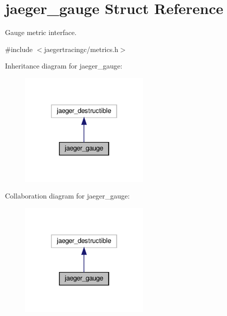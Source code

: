 \hypertarget{structjaeger__gauge}{}\section{jaeger\+\_\+gauge Struct Reference}
\label{structjaeger__gauge}


Gauge metric interface.  




{\ttfamily \#include $<$jaegertracingc/metrics.\+h$>$}



Inheritance diagram for jaeger\+\_\+gauge\+:\nopagebreak
\begin{figure}[H]
\begin{center}
\leavevmode
\includegraphics[width=178pt]{structjaeger__gauge__inherit__graph}
\end{center}
\end{figure}


Collaboration diagram for jaeger\+\_\+gauge\+:\nopagebreak
\begin{figure}[H]
\begin{center}
\leavevmode
\includegraphics[width=178pt]{structjaeger__gauge__coll__graph}
\end{center}
\end{figure}
